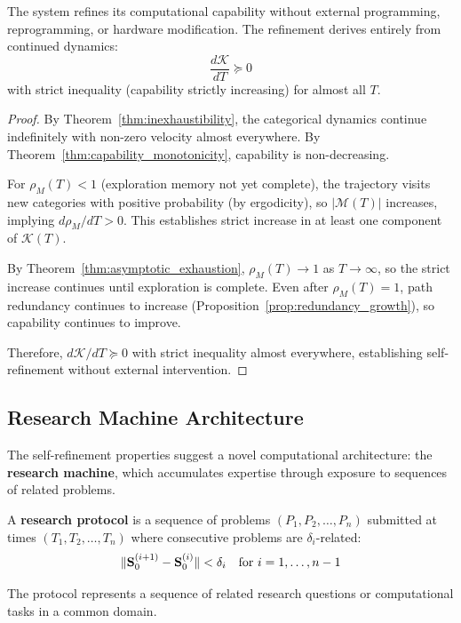 \begin{theorem}
\label{thm:self_refinement}
The system refines its computational capability without external programming, reprogramming, or hardware modification. The refinement derives entirely from continued dynamics:
\begin{equation}
\frac{d\mathcal{K}}{dT} \succeq 0
\label{eq:capability_derivative}
\end{equation}
with strict inequality (capability strictly increasing) for almost all $T$.
\end{theorem}

\begin{proof}
By Theorem~\ref{thm:inexhaustibility}, the categorical dynamics continue indefinitely with non-zero velocity almost everywhere. By Theorem~\ref{thm:capability_monotonicity}, capability is non-decreasing.

For $\rho_M(T) < 1$ (exploration memory not yet complete), the trajectory visits new categories with positive probability (by ergodicity), so $|\mathcal{M}(T)|$ increases, implying $d\rho_M/dT > 0$. This establishes strict increase in at least one component of $\mathcal{K}(T)$.

By Theorem~\ref{thm:asymptotic_exhaustion}, $\rho_M(T) \to 1$ as $T \to \infty$, so the strict increase continues until exploration is complete. Even after $\rho_M(T) = 1$, path redundancy continues to increase (Proposition~\ref{prop:redundancy_growth}), so capability continues to improve.

Therefore, $d\mathcal{K}/dT \succeq 0$ with strict inequality almost everywhere, establishing self-refinement without external intervention.
\end{proof}

\subsection{Research Machine Architecture}

The self-refinement properties suggest a novel computational architecture: the \textbf{research machine}, which accumulates expertise through exposure to sequences of related problems.

\begin{definition}
\label{def:research_protocol}
A \textbf{research protocol} is a sequence of problems $(P_1, P_2, \ldots, P_n)$ submitted at times $(T_1, T_2, \ldots, T_n)$ where consecutive problems are $\delta_i$-related:
\begin{equation}
\|\mathbf{S}_0^{(i+1)} - \mathbf{S}_0^{(i)}\| < \delta_i \quad \text{for } i = 1, \ldots, n-1
\label{eq:research_protocol}
\end{equation}

The protocol represents a sequence of related research questions or computational tasks in a common domain.
\end{definition}

